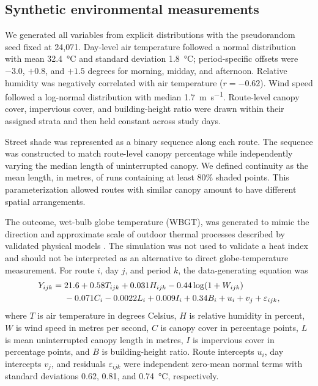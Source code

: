 \subsection{Synthetic environmental measurements}
We generated all variables from explicit distributions with the pseudorandom seed fixed at 24,071. Day-level air temperature followed a normal distribution with mean \SI{32.4}{\degreeCelsius} and standard deviation \SI{1.8}{\degreeCelsius}; period-specific offsets were $-3.0$, $+0.8$, and $+1.5$ degrees for morning, midday, and afternoon. Relative humidity was negatively correlated with air temperature ($r=-0.62$). Wind speed followed a log-normal distribution with median \SI{1.7}{m.s^{-1}}. Route-level canopy cover, impervious cover, and building-height ratio were drawn within their assigned strata and then held constant across study days.

Street shade was represented as a binary sequence along each route. The sequence was constructed to match route-level canopy percentage while independently varying the median length of uninterrupted canopy. We defined continuity as the mean length, in metres, of runs containing at least 80\% shaded points. This parameterization allowed routes with similar canopy amount to have different spatial arrangements.

The outcome, wet-bulb globe temperature (WBGT), was generated to mimic the direction and approximate scale of outdoor thermal processes described by validated physical models \cite{Liljegren2008}. The simulation was not used to validate a heat index and should not be interpreted as an alternative to direct globe-temperature measurement. For route $i$, day $j$, and period $k$, the data-generating equation was
\begin{align}
Y_{ijk}={}&21.6 + 0.58T_{ijk}+0.031H_{ijk}-0.44\log(1+W_{ijk}) \notag\\
&-0.071C_i-0.0022L_i+0.009I_i+0.34B_i
+u_i+v_j+\varepsilon_{ijk},
\label{eq:dgp}
\end{align}
where $T$ is air temperature in degrees Celsius, $H$ is relative humidity in percent, $W$ is wind speed in metres per second, $C$ is canopy cover in percentage points, $L$ is mean uninterrupted canopy length in metres, $I$ is impervious cover in percentage points, and $B$ is building-height ratio. Route intercepts $u_i$, day intercepts $v_j$, and residuals $\varepsilon_{ijk}$ were independent zero-mean normal terms with standard deviations 0.62, 0.81, and \SI{0.74}{\degreeCelsius}, respectively.

